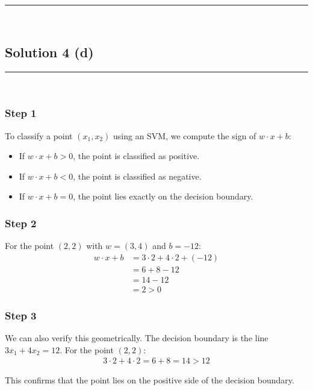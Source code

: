 \documentclass{article}
\begin{document}
\noindent\rule{\textwidth}{0.4pt}\\

\newpage

\subsection*{Solution 4 (d)}
\noindent\rule{\textwidth}{0.4pt}\\

\subsubsection*{Step 1}
\parbox{\textwidth}{
To classify a point $(x_1, x_2)$ using an SVM, we compute the sign of $w \cdot x + b$:
\begin{itemize}
    \item If $w \cdot x + b > 0$, the point is classified as positive.
    \item If $w \cdot x + b < 0$, the point is classified as negative.
    \item If $w \cdot x + b = 0$, the point lies exactly on the decision boundary.
\end{itemize}
}

\subsubsection*{Step 2}
\parbox{\textwidth}{
For the point $(2, 2)$ with $w = (3, 4)$ and $b = -12$:
\begin{align}
w \cdot x + b &= 3 \cdot 2 + 4 \cdot 2 + (-12)\\
&= 6 + 8 - 12\\
&= 14 - 12\\
&= 2 > 0
\end{align}
}

\subsubsection*{Step 3}
\parbox{\textwidth}{
We can also verify this geometrically. The decision boundary is the line $3x_1 + 4x_2 = 12$. For the point $(2, 2)$:
\begin{align}
3 \cdot 2 + 4 \cdot 2 = 6 + 8 = 14 > 12
\end{align}

This confirms that the point lies on the positive side of the decision boundary.
}
\end{document}
